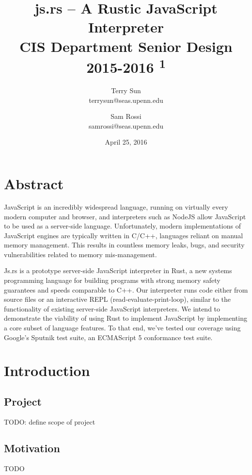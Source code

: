 \documentclass{article}
\title{js.rs -- A Rustic JavaScript Interpreter \\
  {\large CIS Department Senior Design 2015-2016 \textsuperscript{1}}
}
\date{April 25, 2016}
\author{
  Terry Sun\\ terrysun@seas.upenn.edu \and
  Sam Rossi\\ samrossi@seas.upenn.edu
}
\begin{document}
\maketitle

\begin{multicols}{2}

\section*{Abstract}


JavaScript is an incredibly widespread language, running on virtually every
modern computer and browser, and interpreters such as NodeJS allow JavaScript to
be used as a server-side language. Unfortunately, modern implementations of
JavaScript engines are typically written in C/C++, languages reliant on manual
memory management. This results in countless memory leaks, bugs, and security
vulnerabilities related to memory mis-management. \newline

Js.rs is a prototype server-side JavaScript interpreter in Rust, a new systems
programming language for building programs with strong memory safety guarantees
and speeds comparable to C++. Our interpreter runs code either from source files
or an interactive REPL (read-evaluate-print-loop), similar to the functionality
of existing server-side JavaScript interpreters. We intend to demonstrate the
viability of using Rust to implement JavaScript by implementing a core subset of
language features. To that end, we've tested our coverage using Google's Sputnik
test suite, an ECMAScript 5 conformance test suite.

\section{Introduction}

\subsection{Project}

TODO: define scope of project

\subsection{Motivation}

TODO


\end{multicols}
\end{document}

